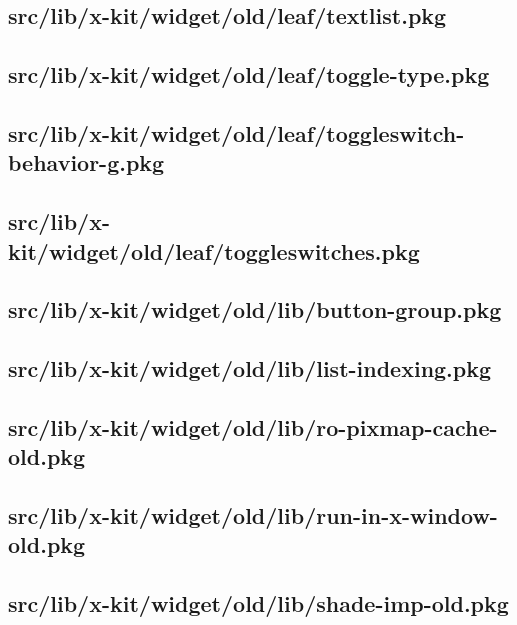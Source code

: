 \subsection{src/lib/x-kit/widget/old/leaf/textlist.pkg}


\subsection{src/lib/x-kit/widget/old/leaf/toggle-type.pkg}


\subsection{src/lib/x-kit/widget/old/leaf/toggleswitch-behavior-g.pkg}


\subsection{src/lib/x-kit/widget/old/leaf/toggleswitches.pkg}


\subsection{src/lib/x-kit/widget/old/lib/button-group.pkg}


\subsection{src/lib/x-kit/widget/old/lib/list-indexing.pkg}


\subsection{src/lib/x-kit/widget/old/lib/ro-pixmap-cache-old.pkg}


\subsection{src/lib/x-kit/widget/old/lib/run-in-x-window-old.pkg}


\subsection{src/lib/x-kit/widget/old/lib/shade-imp-old.pkg}


